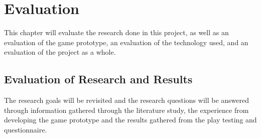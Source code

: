 \chapter{Evaluation}
This chapter will evaluate the research done in this project, as well as an evaluation of the game prototype, an evaluation of the technology used, and an evaluation of the project as a whole.


\section{Evaluation of Research and Results}
The research goals will be revisited and the research questions will be answered through information gathered through the literature study, the experience from developing the game prototype and the results gathered from the play testing and questionnaire.

